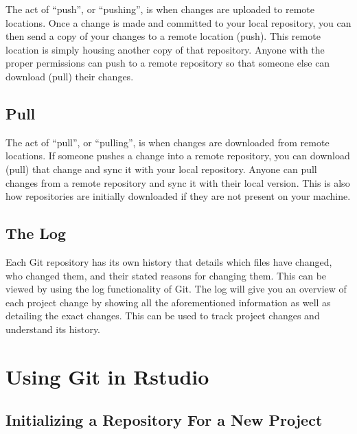\documentclass[
]{book}
\begin{document}
The act of ``push'', or ``pushing'', is when changes are uploaded to remote locations. Once a change is made and committed to your local repository, you can then send a copy of your changes to a remote location (push). This remote location is simply housing another copy of that repository. Anyone with the proper permissions can push to a remote repository so that someone else can download (pull) their changes.

\hypertarget{pull}{%
\section{Pull}\label{pull}}

The act of ``pull'', or ``pulling'', is when changes are downloaded from remote locations. If someone pushes a change into a remote repository, you can download (pull) that change and sync it with your local repository. Anyone can pull changes from a remote repository and sync it with their local version. This is also how repositories are initially downloaded if they are not present on your machine.

\hypertarget{the-log}{%
\section{The Log}\label{the-log}}

Each Git repository has its own history that details which files have changed, who changed them, and their stated reasons for changing them. This can be viewed by using the log functionality of Git. The log will give you an overview of each project change by showing all the aforementioned information as well as detailing the exact changes. This can be used to track project changes and understand its history.

\hypertarget{using-git-in-rstudio}{%
\chapter{Using Git in Rstudio}\label{using-git-in-rstudio}}

\hypertarget{initializing-a-repository-for-a-new-project}{%
\section{Initializing a Repository For a New Project}\label{initializing-a-repository-for-a-new-project}}
\end{document}
